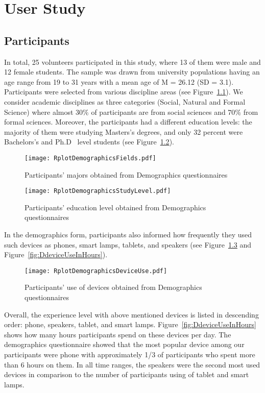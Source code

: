 \chapter{User Study}
\label{ch:user-study}

\section{Participants}
\label{sec:participants}
In total, 25 volunteers participated in this study, where 13 of them were male and 12 female students.
The sample was drawn from university populations having an age range from 19 to 31
years with a mean age of M = 26.12 (SD = 3.1).
Participants were selected from various discipline areas (see Figure~\ref{fig:Dfields}).
We consider academic disciplines as three categories (Social, Natural and Formal Science)
where almost 30\% of participants are from social sciences and 70\% from formal sciences.
Moreover, the participants had a different education levels: the majority of
them were studying Masters’s degrees, and only 32 percent were Bachelors’s
and Ph.D \ level students (see Figure~\ref{fig:DstudyLevels}).

\begin{figure}[H]
  \centering
    \texttt{[image: RplotDemographicsFields.pdf]}
      \caption{Participants' majors obtained from Demographics questionnaires}
      \label{fig:Dfields}
\end{figure}

\begin{figure}[H]
  \centering
    \texttt{[image: RplotDemographicsStudyLevel.pdf]}
      \caption{Participants' education level obtained from Demographics questionnaires}
      \label{fig:DstudyLevels}
\end{figure}

In the demographics form, participants also informed how frequently they used such devices as phones,
smart lamps, tablets, and speakers (see Figure~\ref{fig:DdeviceUse} and Figure~\ref{fig:DdeviceUseInHours}).

\begin{figure}[H]
  \centering
    \texttt{[image: RplotDemographicsDeviceUse.pdf]}
      \caption{Participants' use of devices obtained from Demographics questionnaires}
      \label{fig:DdeviceUse}
\end{figure}

Overall, the experience level with above mentioned devices is listed in
descending order: phone, speakers, tablet, and smart lamps.
Figure~\ref{fig:DdeviceUseInHours} shows how many hours participants spend on these devices per day.
The demographics questionnaire showed that the most popular device among our participants
were phone with approximately 1/3 of participants who spent more than 6 hours on them.
In all time ranges, the speakers were the second most used devices in
comparison to the number of participants using of tablet and smart lamps.

